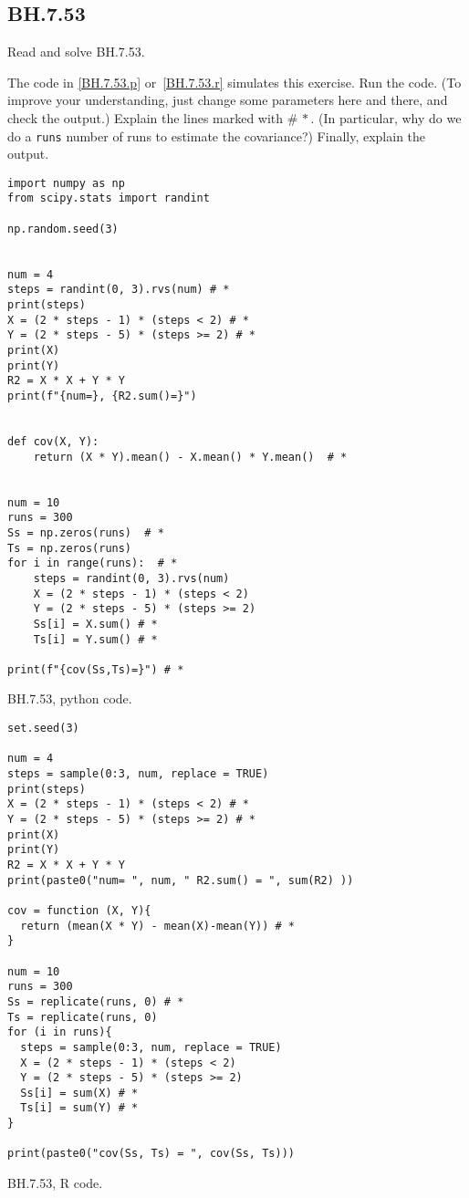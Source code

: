 

\subsection{BH.7.53}
\label{sec:bh.53}

\begin{exercise}
Read and solve BH.7.53.
\end{exercise}


\begin{exercise}
The code in \cref{BH.7.53.p} or~\cref{BH.7.53.r} simulates this exercise.
Run the code. (To improve your understanding, just change some parameters here and there, and check the output.) Explain the lines marked with $\# \, *$. (In particular, why do we do a \verb|runs| number of runs to estimate the covariance?) Finally, explain the output.
\end{exercise}

\begin{listing}[!ht]
\begin{verbatim}
import numpy as np
from scipy.stats import randint

np.random.seed(3)


num = 4
steps = randint(0, 3).rvs(num) # *
print(steps)
X = (2 * steps - 1) * (steps < 2) # *
Y = (2 * steps - 5) * (steps >= 2) # *
print(X)
print(Y)
R2 = X * X + Y * Y
print(f"{num=}, {R2.sum()=}")


def cov(X, Y):
    return (X * Y).mean() - X.mean() * Y.mean()  # *


num = 10
runs = 300
Ss = np.zeros(runs)  # *
Ts = np.zeros(runs)
for i in range(runs):  # *
    steps = randint(0, 3).rvs(num)
    X = (2 * steps - 1) * (steps < 2)
    Y = (2 * steps - 5) * (steps >= 2)
    Ss[i] = X.sum() # *
    Ts[i] = Y.sum() # *

print(f"{cov(Ss,Ts)=}") # *
\end{verbatim}
\caption{BH.7.53, python code.}
\label{BH.7.53.p}


\end{listing}

\begin{listing}[!ht]
\begin{verbatim}
set.seed(3)

num = 4
steps = sample(0:3, num, replace = TRUE)
print(steps)
X = (2 * steps - 1) * (steps < 2) # *
Y = (2 * steps - 5) * (steps >= 2) # *
print(X)
print(Y)
R2 = X * X + Y * Y
print(paste0("num= ", num, " R2.sum() = ", sum(R2) ))

cov = function (X, Y){
  return (mean(X * Y) - mean(X)-mean(Y)) # *
}

num = 10
runs = 300
Ss = replicate(runs, 0) # *
Ts = replicate(runs, 0)
for (i in runs){
  steps = sample(0:3, num, replace = TRUE)
  X = (2 * steps - 1) * (steps < 2)
  Y = (2 * steps - 5) * (steps >= 2)
  Ss[i] = sum(X) # *
  Ts[i] = sum(Y) # *
}

print(paste0("cov(Ss, Ts) = ", cov(Ss, Ts)))
\end{verbatim}
\caption{BH.7.53, R code.}
\label{BH.7.53.r}
\end{listing}

